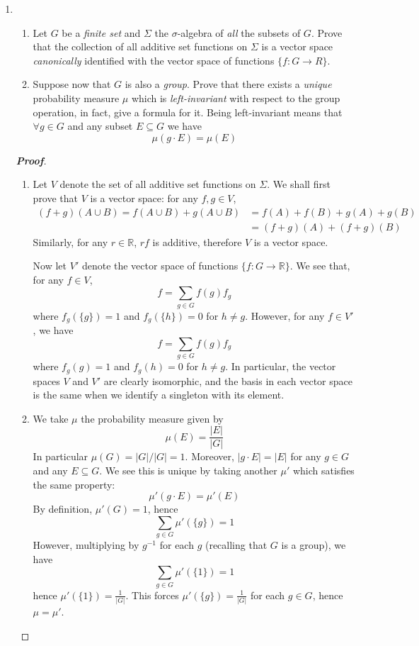 \documentclass[12pt,leqno]{book}
\theoremstyle{definition}
\newcommand{\R}{\mathbb{R}}
\newenvironment{Proof}{\begin{proof}[\textnormal{\textbf{Proof}}]}{\end{proof}}
\begin{document}
\begin{enumerate}
 \item \begin{enumerate}
        \item Let $G$ be a \textit{finite set} and $\Sigma$ the $\sigma$-algebra of \textit{all} the subsets of $G$. Prove that the collection of all additive set functions on $\Sigma$ is a vector space \textit{canonically} identified with the vector space of functions $\{f:G\to R\}$. 
	\item Suppose now that $G$ is also a \textit{group}. Prove that there exists a \textit{unique} probability measure $\mu$ which is \textit{left-invariant} with respect to the group operation, in fact, give a formula for it. Being left-invariant means that $\forall g\in G$ and any subset $E\subseteq G$ we have \[\mu(g\cdot E)=\mu(E)\]
       \end{enumerate}

\begin{Proof}\indent
 \begin{enumerate}
  \item Let $V$ denote the set of all additive set functions on $\Sigma$. We shall first prove that $V$ is a vector space: for any $f,g\in V$, \begin{align*}(f+g)(A\cup B)=f(A\cup B)+g(A\cup B)&=f(A)+f(B)+g(A)+g(B)\\&=(f+g)(A)+(f+g)(B)\end{align*} Similarly, for any $r\in\R$, $rf$ is additive, therefore  $V$ is a vector space.

Now let $V'$ denote the vector space of functions $\{f:G\to\R\}$. We see that, for any $f\in V$, \[f=\sum_{g\in G}f(g)f_g\] where $f_g(\{g\})=1$ and $f_g(\{h\})=0$ for $h\not=g$. However, for any $f\in V'$, we have \[f=\sum_{g\in G}f(g)f_g\] where $f_g(g)=1$ and $f_g(h)=0$ for $h\not=g$. In particular, the vector spaces $V$ and $V'$ are clearly isomorphic, and the basis in each vector space is the same when we identify a singleton with its element.
  \item We take $\mu$ the probability measure given by \[\mu(E)=\frac{|E|}{|G|}\] In particular $\mu(G)=|G|/|G|=1$. Moreover, $|g\cdot E|=|E|$ for any $g\in G$ and any $E\subseteq G$. We see this is unique by taking another $\mu'$ which satisfies the same property: \[\mu'(g\cdot E)=\mu'(E)\] By definition, $\mu'(G)=1$, hence \[\sum_{g\in G}\mu'(\{g\})=1\] However, multiplying by $g^{-1}$ for each $g$ (recalling that $G$ is a group), we have \[\sum_{g\in G}\mu'(\{1\})=1\] hence $\mu'(\{1\})=\frac{1}{|G|}$. This forces $\mu'(\{g\})=\frac{1}{|G|}$ for each $g\in G$, hence $\mu=\mu'$.
 \end{enumerate}


\end{Proof}
\end{enumerate}
\end{document}
